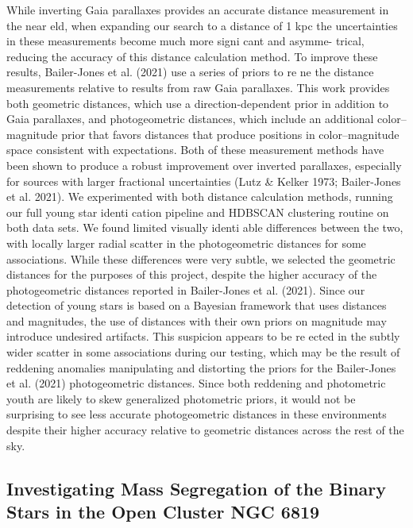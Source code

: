 \documentclass[../Main.tex]{subfiles}
\begin{document}
{While inverting Gaia parallaxes provides an accurate
distance measurement in the near eld, when expanding our
search to a distance of 1 kpc the uncertainties in these
measurements become much more signi cant and asymme-
trical, reducing the accuracy of this distance calculation method. To improve these results, Bailer-Jones et al. (2021)
use a series of priors to re ne the distance measurements
relative to results from raw Gaia parallaxes. This work provides
both geometric distances, which use a direction-dependent
prior in addition to Gaia parallaxes, and photogeometric
distances, which include an additional color–magnitude prior
that favors distances that produce positions in color–magnitude
space consistent with expectations. Both of these measurement
methods have been shown to produce a robust improvement
over inverted parallaxes, especially for sources with larger
fractional uncertainties (Lutz & Kelker 1973; Bailer-Jones et al.
2021). We experimented with both distance calculation
methods, running our full young star identi cation pipeline
and HDBSCAN clustering routine on both data sets. We found
limited visually identi able differences between the two, with
locally larger radial scatter in the photogeometric distances for
some associations. While these differences were very subtle,
we selected the geometric distances for the purposes of this
project, despite the higher accuracy of the photogeometric
distances reported in Bailer-Jones et al. (2021). Since our
detection of young stars is based on a Bayesian framework that
uses distances and magnitudes, the use of distances with their
own priors on magnitude may introduce undesired artifacts.
This suspicion appears to be re ected in the subtly wider scatter
in some associations during our testing, which may be the
result of reddening anomalies manipulating and distorting the
priors for the Bailer-Jones et al. (2021) photogeometric
distances. Since both reddening and photometric youth are
likely to skew generalized photometric priors, it would not be
surprising to see less accurate photogeometric distances in
these environments despite their higher accuracy relative to
geometric distances across the rest of the sky.

\subsection{Investigating Mass Segregation of the Binary Stars in the Open Cluster NGC 6819}

}
\end{document}

